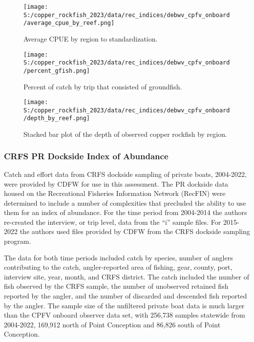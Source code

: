 \documentclass[11pt,
  english,
  letterpaper,
]{article}
\begin{document}
\newpage

\begin{figure}
\centering
\texttt{[image: S:/copper\_rockfish\_2023/data/rec\_indices/debwv\_cpfv\_onboard/average\_cpue\_by\_reef.png]}
\caption{Average CPUE by region to standardization.\label{fig:deb-regioncpue}}
\end{figure}

\newpage

\begin{figure}
\centering
\texttt{[image: S:/copper\_rockfish\_2023/data/rec\_indices/debwv\_cpfv\_onboard/percent\_gfish.png]}
\caption{Percent of catch by trip that consisted of groundfish.\label{fig:deb-percent-gfish}}
\end{figure}

\newpage

\begin{figure}
\centering
\texttt{[image: S:/copper\_rockfish\_2023/data/rec\_indices/debwv\_cpfv\_onboard/depth\_by\_reef.png]}
\caption{Stacked bar plot of the depth of observed copper rockfish by region.\label{fig:deb-depths}}
\end{figure}

\newpage

\hypertarget{crfs-pr-index}{%
\subsubsection{CRFS PR Dockside Index of Abundance}\label{crfs-pr-index}}

Catch and effort data from CRFS dockside sampling of private boats, 2004-2022, were provided by CDFW for use in this assessment. The PR dockside data housed on the Recreational Fisheries Information Network (RecFIN) were determined to include a number of complexities that precluded the ability to use them for an index of abundance. For the time period from 2004-2014 the authors re-created the interview, or trip level, data from the ``i'' sample files. For 2015-2022 the authors used files provided by CDFW from the CRFS dockside sampling program.

The data for both time periods included catch by species, number of anglers contributing to the catch, angler-reported area of fishing, gear, county, port, interview site, year, month, and CRFS district. The catch included the number of fish observed by the CRFS sample, the number of unobserved retained fish reported by the angler, and the number of discarded and descended fish reported by the angler. The sample size of the unfiltered private boat data is much larger than the CPFV onboard observer data set, with 256,738 samples statewide from 2004-2022, 169,912 north of Point Conception and 86,826 south of Point Conception.
\end{document}
